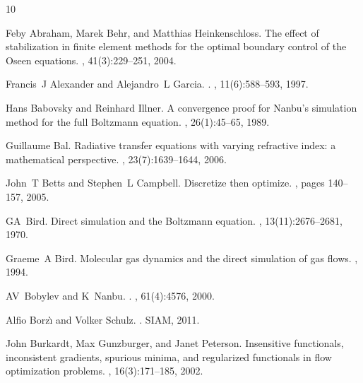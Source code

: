 \documentclass[12pt]{amsart}
\begin{document}
\begin{thebibliography}{10}

Feby Abraham, Marek Behr, and Matthias Heinkenschloss.
\newblock The effect of stabilization in finite element methods for the optimal
  boundary control of the {O}seen equations.
, 41(3):229--251, 2004.

Francis~J Alexander and Alejandro~L Garcia.
.
, 11(6):588--593, 1997.

Hans Babovsky and Reinhard Illner.
\newblock A convergence proof for {N}anbu’s simulation method for the full
  {Boltzmann} equation.
, 26(1):45--65, 1989.

Guillaume Bal.
\newblock Radiative transfer equations with varying refractive index: a
  mathematical perspective.
, 23(7):1639--1644, 2006.

John~T Betts and Stephen~L Campbell.
\newblock Discretize then optimize.
, pages
  140--157, 2005.

GA~Bird.
\newblock Direct simulation and the {B}oltzmann equation.
, 13(11):2676--2681, 1970.

Graeme~A Bird.
\newblock Molecular gas dynamics and the direct simulation of gas flows.
,
  1994.

AV~Bobylev and K~Nanbu.
.
, 61(4):4576, 2000.

Alfio Borz{\`\i} and Volker Schulz.
.
\newblock SIAM, 2011.

John Burkardt, Max Gunzburger, and Janet Peterson.
\newblock Insensitive functionals, inconsistent gradients, spurious minima, and
  regularized functionals in flow optimization problems.
,
  16(3):171--185, 2002.


\end{thebibliography}
\end{document}
